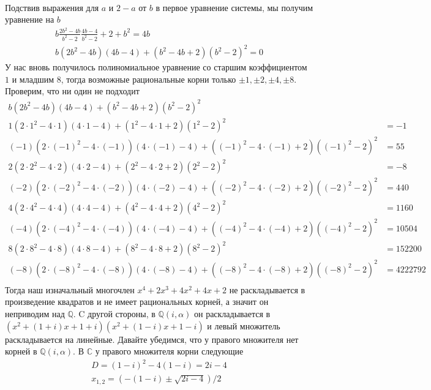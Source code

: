 \documentclass{article}
\begin{document}
\begin{enumerate}
\begin{align*}
        \end{align*}
        Подствив выражения для $a$ и $2-a$ от $b$ в первое уравнение системы,
        мы получим уравнение на $b$
        \begin{align*}
            b\frac{2b^2-4b}{b^2-2}\frac{4b-4}{b^2-2}+2+b^2=4b\\
            b(2b^2-4b)(4b-4)+(b^2-4b+2)(b^2-2)^2=0
        \end{align*}
        У нас вновь получилось полиномиальное уравнение со старшим коэффициентом
        $1$ и младшим $8$, тогда возможные рациональные корни только $\pm1,\pm2,
        \pm4,\pm8$. Проверим, что ни один не подходит
        \begin{align*}
            b(2b^2-4b)(4b-4)+(b^2-4b+2)(b^2-2)^2&\\
            1(2\cdot 1^2-4\cdot 1)(4\cdot 1-4)+(1^2-4\cdot 1+2)(1^2-2)^2&=-1\\
            (-1)(2\cdot (-1)^2-4\cdot (-1))(4\cdot (-1)-4)+((-1)^2-4\cdot (-1)+2)((-1)^2-2)^2&=55\\
            2(2\cdot 2^2-4\cdot 2)(4\cdot 2-4)+(2^2-4\cdot 2+2)(2^2-2)^2&=-8\\
            (-2)(2\cdot (-2)^2-4\cdot (-2))(4\cdot (-2)-4)+((-2)^2-4\cdot (-2)+2)((-2)^2-2)^2&=440\\
            4(2\cdot 4^2-4\cdot 4)(4\cdot 4-4)+(4^2-4\cdot 4+2)(4^2-2)^2&=1160\\
            (-4)(2\cdot (-4)^2-4\cdot (-4))(4\cdot (-4)-4)+((-4)^2-4\cdot (-4)+2)((-4)^2-2)^2&=10504\\
            8(2\cdot 8^2-4\cdot 8)(4\cdot 8-4)+(8^2-4\cdot 8+2)(8^2-2)^2&=152200\\
            (-8)(2\cdot (-8)^2-4\cdot (-8))(4\cdot (-8)-4)+((-8)^2-4\cdot (-8)+2)((-8)^2-2)^2&=4222792\\
        \end{align*}
        Тогда наш изначальный многочлен $x^4+2x^3+4x^2+4x+2$ не раскладывается
        в произведение квадратов и не имеет рациональных корней, а значит он
        неприводим над $\mathbb{Q}$. C другой стороны, в $\mathbb{Q}(i,\alpha)$
        он раскладывается в $(x^2+(1+i)x+1+i)(x^2+(1-i)x+1-i)$ и левый
        множитель раскладывается на линейные. Давайте убедимся, что у правого
        множителя нет корней в $\mathbb{Q}(i,\alpha)$. В $\mathbb{C}$ у правого
        множителя корни следующие
        \begin{align*}
            D=(1-i)^2-4(1-i)=2i-4\\
            x_{1,2}=(-(1-i)\pm\sqrt{2i-4})/2

\end{align*}
\end{enumerate}
\end{document}
